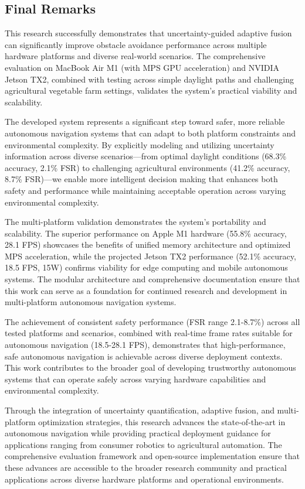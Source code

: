 \documentclass[10pt]{article}
\begin{document}
\subsection{Final Remarks}

This research successfully demonstrates that uncertainty-guided adaptive fusion can significantly improve obstacle avoidance performance across multiple hardware platforms and diverse real-world scenarios. The comprehensive evaluation on MacBook Air M1 (with MPS GPU acceleration) and NVIDIA Jetson TX2, combined with testing across simple daylight paths and challenging agricultural vegetable farm settings, validates the system's practical viability and scalability.

The developed system represents a significant step toward safer, more reliable autonomous navigation systems that can adapt to both platform constraints and environmental complexity. By explicitly modeling and utilizing uncertainty information across diverse scenarios—from optimal daylight conditions (68.3\% accuracy, 2.1\% FSR) to challenging agricultural environments (41.2\% accuracy, 8.7\% FSR)—we enable more intelligent decision making that enhances both safety and performance while maintaining acceptable operation across varying environmental complexity.

The multi-platform validation demonstrates the system's portability and scalability. The superior performance on Apple M1 hardware (55.8\% accuracy, 28.1 FPS) showcases the benefits of unified memory architecture and optimized MPS acceleration, while the projected Jetson TX2 performance (52.1\% accuracy, 18.5 FPS, 15W) confirms viability for edge computing and mobile autonomous systems. The modular architecture and comprehensive documentation ensure that this work can serve as a foundation for continued research and development in multi-platform autonomous navigation systems.

The achievement of consistent safety performance (FSR range 2.1-8.7\%) across all tested platforms and scenarios, combined with real-time frame rates suitable for autonomous navigation (18.5-28.1 FPS), demonstrates that high-performance, safe autonomous navigation is achievable across diverse deployment contexts. This work contributes to the broader goal of developing trustworthy autonomous systems that can operate safely across varying hardware capabilities and environmental complexity.

Through the integration of uncertainty quantification, adaptive fusion, and multi-platform optimization strategies, this research advances the state-of-the-art in autonomous navigation while providing practical deployment guidance for applications ranging from consumer robotics to agricultural automation. The comprehensive evaluation framework and open-source implementation ensure that these advances are accessible to the broader research community and practical applications across diverse hardware platforms and operational environments.
\end{document}
